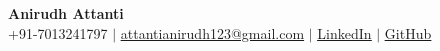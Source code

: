 \documentclass[letterpaper,11pt]{article}
\begin{document}

\begin{center}
    \textbf{\Huge Anirudh Attanti} \\ \vspace{0.2cm}
    \normalsize
    +91-7013241797 \enspace $|$ \enspace
    \href{mailto:attantianirudh123@gmail.com}{\underline{attantianirudh123@gmail.com}} \enspace $|$ \enspace
    \href{https://www.linkedin.com/in/attanti-anirudh-988b8b157/}{\underline{LinkedIn}} \enspace $|$ \enspace
    \href{https://github.com/ANlRUDH}{\underline{GitHub}}
\end{center}
\end{document}
